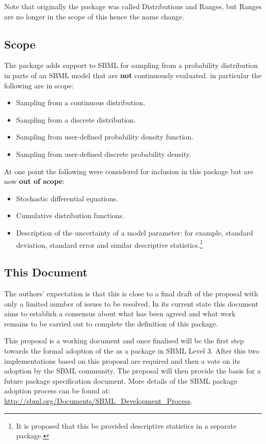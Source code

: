 \documentclass[draftspec]{sbmlpkgspec}
\begin{document}
Note that originally the package was called Distributions and Ranges,
but Ranges are no longer in the scope of this hence the name change.

\subsection{Scope}

The \distrib package adds support to SBML for sampling from a
probability distribution in parts of an SBML model that are
\textbf{not} continuously evaluated. in particular the following are
in scope:

\begin{itemize}
\item Sampling from a continuous distribution.
\item Sampling from a discrete distribution.
\item Sampling from user-defined probability density function.
\item Sampling from user-defined discrete probability density.
\end{itemize}

At one point the following were considered for inclusion in this
package but are now \textbf{out of scope}:

\begin{itemize}
\item Stochastic differential equations.
\item Cumulative distribution functions.
\item Description of the uncertainty of a model parameter: for
  example, standard deviation, standard error and similar descriptive
  statistics.\footnote{It is proposed that this be provided
    descriptive statistics in a separate package.}
\end{itemize}

\subsection{This Document}

The authors' expectation is that this is close to a final draft of the
proposal with only a limited number of issues to be resolved. In its
current state this document aims to establish a consensus about what
has been agreed and what work remains to be carried out to complete
the definition of this package.

This proposal is a working document and once finalised will be the
first step towards the formal adoption of the \distribshort as a
package in SBML Level 3. After this two implementations based on this
proposal are required and then a vote on its adoption by the SBML
community. The proposal will then provide the basis for a future
package specification document. More details of the SBML package
adoption process can be found at:
\url{http://sbml.org/Documents/SBML_Development_Process}.
\end{document}
